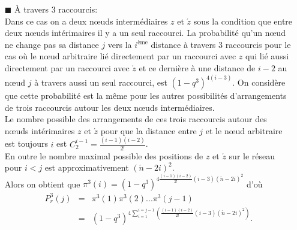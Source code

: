 \begin{itemize}
\item[$\blacksquare$]  \`{A} travers $3$ raccourcis:\\
	Dans ce cas on a deux nœuds intermédiaires $z$ et $\acute{z}$ sous la condition que entre deux nœuds intérimaires il y a un seul raccourci.
	La probabilité qu'un nœud ne change pas sa distance $j$ vers la $i^{\text{ème}}$ distance à travers $3$ raccourcis pour le cas où le
	nœud arbitraire lié directement par un raccourci avec $z$ qui lié aussi directement par un raccourci avec $\acute{z}$ et ce 
	dernière à une distance de $i-2$ au nœud $j$ à travers aussi un seul raccourci, est $(1-q^3)^{4(i-3)}$. On considère que cette probabilité est la m\^{e}me
	pour les autres possibilités d'arrangements de trois raccourcis autour les deux nœuds intermédiaires.\\
	Le nombre possible des
	arrangements de ces trois raccourcis autour des nœuds intérimaires $z$ et $\acute{z}$ pour que la distance entre $j$ et le	nœud arbitraire est toujours $i$ est $C_2^{i-1}=\frac{(i-1)(i-2)}{2!}$.\\
	 En outre le nombre maximal possible des positions de $z$ et
	$\acute{z}$ sur le réseau pour $i<j$ est approximativement $(\acute{n}-2i)^2$.\\
	
	Alors on obtient que $\pi^3(i)=(1-q^3)^{4\frac{(i-1)(i-2)}{2!}(i-3)(\acute{n}-2i)^2}\nonumber$ d'où
	\begin{eqnarray}
	P_r^3(j)&=&\pi^3(1)\pi^3(2)...\pi^3(j-1)\\\nonumber
	&=& (1-q^3)^{4\sum_{i=1}^{i=j-1}(\frac{(i-1)(i-2)}{2!}(i-3)(\acute{n}-2i)^2)}.
	\end{eqnarray}
	

\end{itemize}

